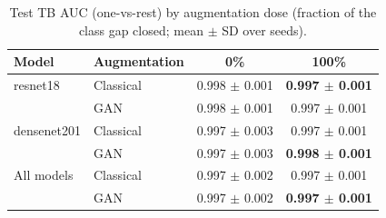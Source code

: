 \begin{table}[htbp]
\centering
\caption{Test TB AUC (one-vs-rest) by augmentation dose (fraction of the class gap closed; mean $\pm$ SD over seeds).}
\label{tab:dose_tb_auc}
\begin{tabular}{llcc}
\toprule
Model & Augmentation & 0\% & 100\% \\
\midrule
resnet18 & Classical & 0.998 $\pm$ 0.001 & \textbf{0.997 $\pm$ 0.001} \\
 & GAN & 0.998 $\pm$ 0.001 & 0.997 $\pm$ 0.001 \\
\addlinespace
densenet201 & Classical & 0.997 $\pm$ 0.003 & 0.997 $\pm$ 0.001 \\
 & GAN & 0.997 $\pm$ 0.003 & \textbf{0.998 $\pm$ 0.001} \\
\addlinespace
All models & Classical & 0.997 $\pm$ 0.002 & 0.997 $\pm$ 0.001 \\
 & GAN & 0.997 $\pm$ 0.002 & \textbf{0.997 $\pm$ 0.001} \\
\bottomrule
\end{tabular}
\end{table}